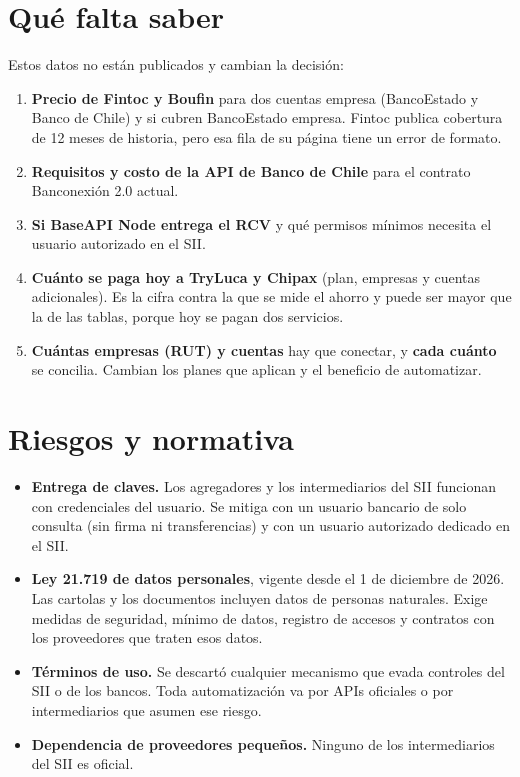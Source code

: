 \documentclass[11pt,a4paper]{article}
\begin{document}
\section{Qué falta saber}

Estos datos no están publicados y cambian la decisión:

\begin{enumerate}
  \item \textbf{Precio de Fintoc y Boufin} para dos cuentas empresa (BancoEstado y Banco de Chile) y si cubren BancoEstado empresa. Fintoc publica cobertura de 12 meses de historia, pero esa fila de su página tiene un error de formato.
  \item \textbf{Requisitos y costo de la API de Banco de Chile} para el contrato Banconexión 2.0 actual.
  \item \textbf{Si BaseAPI Node entrega el RCV} y qué permisos mínimos necesita el usuario autorizado en el SII.
  \item \textbf{Cuánto se paga hoy a TryLuca y Chipax} (plan, empresas y cuentas adicionales). Es la cifra contra la que se mide el ahorro y puede ser mayor que la de las tablas, porque hoy se pagan dos servicios.
  \item \textbf{Cuántas empresas (RUT) y cuentas} hay que conectar, y \textbf{cada cuánto} se concilia. Cambian los planes que aplican y el beneficio de automatizar.
\end{enumerate}

\section{Riesgos y normativa}

\begin{itemize}
  \item \textbf{Entrega de claves.} Los agregadores y los intermediarios del SII funcionan con credenciales del usuario. Se mitiga con un usuario bancario de solo consulta (sin firma ni transferencias) y con un usuario autorizado dedicado en el SII.
  \item \textbf{Ley 21.719 de datos personales}, vigente desde el 1 de diciembre de 2026. Las cartolas y los documentos incluyen datos de personas naturales. Exige medidas de seguridad, mínimo de datos, registro de accesos y contratos con los proveedores que traten esos datos.
  \item \textbf{Términos de uso.} Se descartó cualquier mecanismo que evada controles del SII o de los bancos. Toda automatización va por APIs oficiales o por intermediarios que asumen ese riesgo.
  \item \textbf{Dependencia de proveedores pequeños.} Ninguno de los intermediarios del SII es oficial.
\end{itemize}
\end{document}
